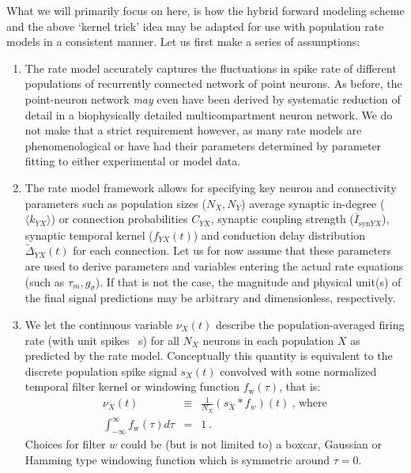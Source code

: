 What we will primarily focus on here,
is how the hybrid forward modeling scheme and the above `kernel trick' idea may be adapted for use with population rate models in a consistent manner.
Let us first make a series of assumptions:
\begin{enumerate}
\item The rate model accurately captures the fluctuations in spike rate of different populations of recurrently connected network of point neurons.
As before, the point-neuron network \textit{may} even have been derived by systematic reduction of detail in a biophysically detailed multicompartment neuron network.
We do not make that a strict requirement however,
as many rate models are phenomenological or have had their parameters determined by parameter fitting to either experimental or model data.

\item The rate model framework allows for specifying key neuron and connectivity parameters such as
population sizes ($N_X, N_Y$) average synaptic in-degree ($\langle k_{YX} \rangle$) or connection probabilities $C_{YX}$,
synaptic coupling strength ($\overline{I}_{\mathrm{syn}YX}$),
synaptic temporal kernel ($f_{YX}(t)$) and
conduction delay distribution $\widetilde{\Delta}_{YX}(t)$ for each connection.
Let us for now assume that these parameters are used to derive parameters and variables entering the actual rate equations (such as $\tau_m, g_\sigma$).
If that is not the case, the magnitude and physical unit(s) of the final signal predictions may be arbitrary and dimensionless, respectively.

\item We let the continuous variable $\nu_X(t)$ describe the population-averaged firing rate (with unit spikes \si{\per\second}) for all $N_X$ neurons in each population $X$ as predicted by the rate model.
Conceptually this quantity is equivalent to the discrete population spike signal $s_X(t)$ convolved with some normalized temporal filter kernel or windowing function $f_\mathrm{w}(\tau)$, that is:
\begin{eqnarray}
\nu_X(t) &\equiv& \frac{1}{N_X} \left(s_X \ast f_w \right)(t)~\text{, where} \\
\int_{-\infty}^\infty f_\mathrm{w}(\tau) d\tau &=& 1 ~.
\end{eqnarray}
Choices for filter $w$ could be (but is not limited to) a boxcar, Gaussian or Hamming type windowing function which is symmetric around $\tau = 0$.

\end{enumerate}

